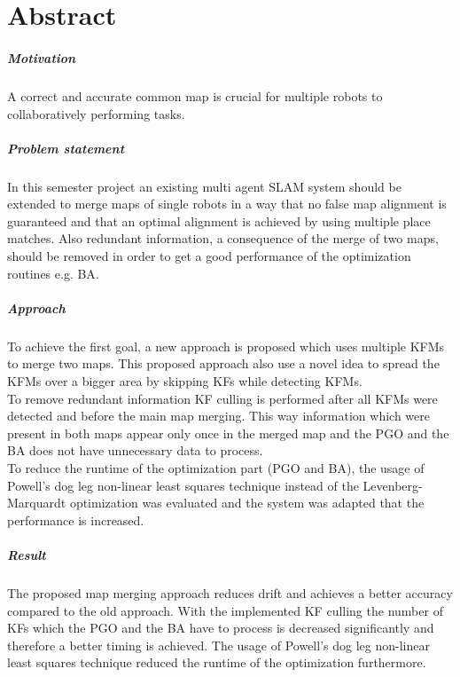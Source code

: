 \chapter*{Abstract}

\paragraph*{Motivation}
A correct and accurate common map is crucial for multiple robots to collaboratively performing tasks. 

\paragraph*{Problem statement}
In this semester project an existing multi agent \ac{SLAM} system should be extended to merge maps of single robots in a way that no false map alignment is guaranteed and that an optimal alignment is achieved by using multiple place matches. Also redundant information, a consequence of the merge of two maps, should be removed in order to get a good performance of the optimization routines e.g. \ac{BA}.

\paragraph*{Approach}
To achieve the first goal, a new approach is proposed which uses multiple \acp{KFM} to merge two maps. This proposed approach also use a novel idea to spread the \acp{KFM} over a bigger area by skipping \acp{KF} while detecting \acp{KFM}.\\
To remove redundant information \ac{KF} culling is performed after all \acp{KFM} were detected and before the main map merging. This way information which were present in both maps appear only once in the merged map and the \ac{PGO} and the \ac{BA} does not have unnecessary data to process.\\
To reduce the runtime of the optimization part (\ac{PGO} and \ac{BA}), the usage of Powell's dog leg non-linear least squares technique instead of the Levenberg-Marquardt optimization was evaluated and the system was adapted that the performance is increased.


\paragraph*{Result}
The proposed map merging approach reduces drift and achieves a better accuracy compared to the old approach. With the implemented \ac{KF} culling the number of \acp{KF} which the \ac{PGO} and the \ac{BA} have to process is decreased significantly and therefore a better timing is achieved. The usage of Powell's dog leg non-linear least squares technique reduced the runtime of the optimization furthermore.
